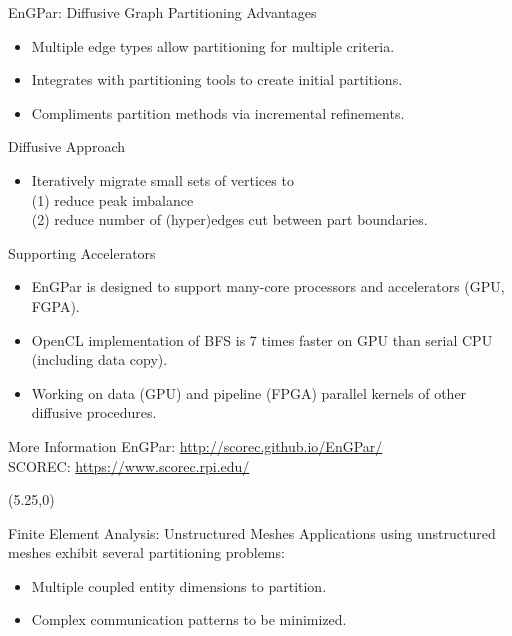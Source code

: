 \documentclass{beamer}
\begin{document}
\begin{textblock}{15.6}
\begin{textblock}{5.1}
\begin{block}{\centering EnGPar: Diffusive Graph Partitioning}
      Advantages
      \begin{itemize}
      \item Multiple edge types allow partitioning for multiple criteria.
      \item Integrates with partitioning tools to create initial partitions.
      \item Compliments partition methods via incremental refinements.
      \end{itemize}
      
      Diffusive Approach
      \begin{itemize}
      \item Iteratively migrate small sets of vertices to \\(1) reduce peak imbalance \\(2) reduce number of (hyper)edges cut between part boundaries.
      \end{itemize}
    \end{block}
    \begin{block}{\centering Supporting Accelerators}
      \begin{itemize}
      \item EnGPar is designed to support many-core processors and accelerators (GPU, FGPA).
      \item OpenCL implementation of BFS is 7 times faster on GPU than serial CPU (including data copy).
      \item Working on data (GPU) and pipeline (FPGA) parallel kernels of other diffusive procedures.
      \end{itemize}

    \end{block}
    \begin{block}{\centering More Information}
      EnGPar: \url{http://scorec.github.io/EnGPar/} \\
      SCOREC: \url{https://www.scorec.rpi.edu/}
    \end{block}

  \end{textblock}
  \begin{textblock}{5.1}(5.25,0)
    \begin{block}{\centering Finite Element Analysis: Unstructured Meshes}
      Applications using unstructured meshes exhibit several partitioning problems:
      \begin{itemize}
      \item Multiple coupled entity dimensions to partition.
      \item Complex communication patterns to be minimized.
      \end{itemize}
      

\end{block}
\end{textblock}
\end{textblock}
\end{document}
